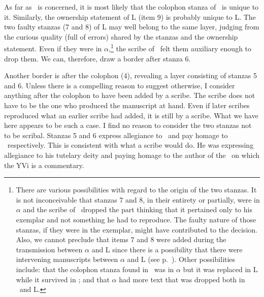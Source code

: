 As far as \Tm\ is concerned, it is most likely that the colophon stanza of \Tm\ is unique to it. Similarly, the ownership statement of L (item 9) is probably unique to L\@. The two faulty stanzas (7 and 8) of L may well belong to the same layer, judging from the curious quality (full of errors) shared by the stanzas and the ownership statement. Even if they were in $\alpha$,\footnote{There are various possibilities with regard to the origin of the two stanzas. It is not inconceivable that stanzas 7 and 8, in their entirety or partially, were in $\alpha$ and the scribe of \Tm\ dropped the part thinking that it pertained only to his exemplar and not something he had to reproduce. The faulty nature of those stanzas, if they were in the exemplar, might have contributed to the decision. Also, we cannot preclude that items 7 and 8 were added during the transmission between $\alpha$ and L since there is a possibility that there were intervening manuscripts between $\alpha$ and L (see p.~\pageref{LandALPHA}). Other possibilities include: that the colophon stanza found in \Tm\ was in $\alpha$ but it was replaced in L while it survived in \Tm; and that $\alpha$ had more text that was dropped both in \Tm\ and L\@.} 
%
the scribe of \Tm\ felt them auxiliary enough to drop them. We can, therefore, draw a border after stanza 6.


Another border is after the colophon (4), revealing a layer consisting of stanzas 5 and 6. Unless there is a compelling reason to suggest otherwise, I consider anything after the colophon to have been added by a scribe. The scribe does not have to be the one who produced the manuscript at hand. Even if later scribes reproduced what an earlier scribe had added, it is still by a scribe. What we have here appears to be such a case. I find no reason to consider the two stanzas not to be scribal. Stanzas 5 and 6 express allegiance to \Visnu\ and pay homage to \Patanjali\ respectively. This is consistent with what a scribe would do. He was expressing allegiance to his tutelary deity and paying homage to the author of the \PYS\ on which the YVi is a commentary. %

